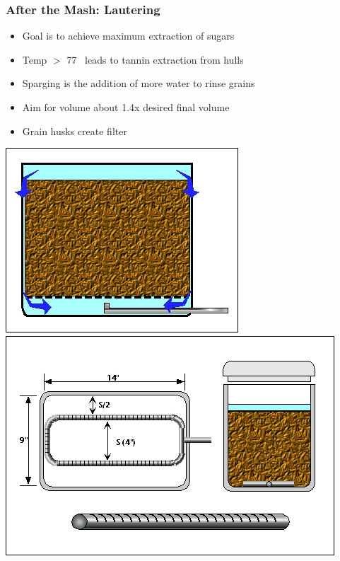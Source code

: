 \documentclass{beamer}
\begin{document}
\begin{frame}
\frametitle{After the Mash: Lautering}
\begin{itemize}
\item Goal is to achieve maximum extraction of sugars
\item Temp $>$ 77\degree~  leads to tannin extraction from hulls
  \item Sparging is the addition of more water to rinse grains
\item Aim for volume about 1.4x desired final volume
\item Grain husks create filter
\end{itemize}
\includegraphics[width=.41\textwidth]{./brewing/lauter1.jpg}
\hspace*{3mm}
\includegraphics[width=.488\textwidth]{./brewing/lauter2.jpg}
\end{frame}
\end{document}
